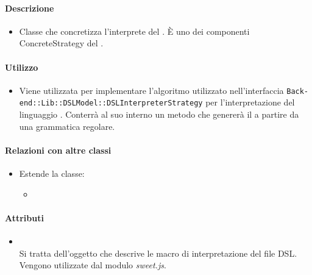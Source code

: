 \paragraph*{Descrizione}
\begin{itemize}
\item[] Classe che concretizza l'interprete del . È uno dei componenti ConcreteStrategy del  .
\end{itemize}

\paragraph*{Utilizzo}
\begin{itemize}
\item[] Viene utilizzata per implementare l'algoritmo utilizzato nell'interfaccia \texttt{Back-end::Lib::DSLModel::DSLInterpreterStrategy} per l'interpretazione del linguaggio . Conterrà al suo interno un metodo che genererà il  a partire da una grammatica regolare.
\end{itemize}

\paragraph*{Relazioni con altre classi}
\begin{itemize}
\item[] Estende la classe:
\begin{itemize}
\item {}
\end{itemize}


\end{itemize}

\paragraph*{Attributi}
\begin{itemize}
\item[]  \\ Si tratta dell'oggetto che descrive le macro di interpretazione del file DSL. Vengono utilizzate dal modulo \textit{sweet.js}.
\end{itemize}

